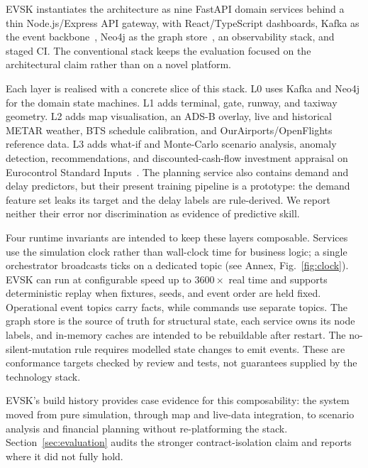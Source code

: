 \documentclass[runningheads]{llncs}
\begin{document}
EVSK instantiates the architecture as nine FastAPI domain services behind a thin Node.js/Express API gateway, with React/TypeScript dashboards, Kafka as the event backbone~\cite{kreps2011}, Neo4j as the graph store~\cite{angles2008}, an observability stack, and staged CI. The conventional stack keeps the evaluation focused on the architectural claim rather than on a novel platform.

Each layer is realised with a concrete slice of this stack. L0 uses Kafka and Neo4j for the domain state machines. L1 adds terminal, gate, runway, and taxiway geometry. L2 adds map visualisation, an ADS-B overlay, live and historical METAR weather, BTS schedule calibration, and OurAirports/OpenFlights reference data. L3 adds what-if and Monte-Carlo scenario analysis, anomaly detection, recommendations, and discounted-cash-flow investment appraisal on Eurocontrol Standard Inputs~\cite{eurocontrol2024}. The planning service also contains demand and delay predictors, but their present training pipeline is a prototype: the demand feature set leaks its target and the delay labels are rule-derived. We report neither their error nor discrimination as evidence of predictive skill.

Four runtime invariants are intended to keep these layers composable. Services use the simulation clock rather than wall-clock time for business logic; a single orchestrator broadcasts ticks on a dedicated topic (see Annex, Fig.~\ref{fig:clock}). EVSK can run at configurable speed up to $3600\times$ real time and supports deterministic replay when fixtures, seeds, and event order are held fixed. Operational event topics carry facts, while commands use separate topics. The graph store is the source of truth for structural state, each service owns its node labels, and in-memory caches are intended to be rebuildable after restart. The no-silent-mutation rule requires modelled state changes to emit events. These are conformance targets checked by review and tests, not guarantees supplied by the technology stack.

EVSK's build history provides case evidence for this composability: the system moved from pure simulation, through map and live-data integration, to scenario analysis and financial planning without re-platforming the stack. Section~\ref{sec:evaluation} audits the stronger contract-isolation claim and reports where it did not fully hold.
\end{document}
